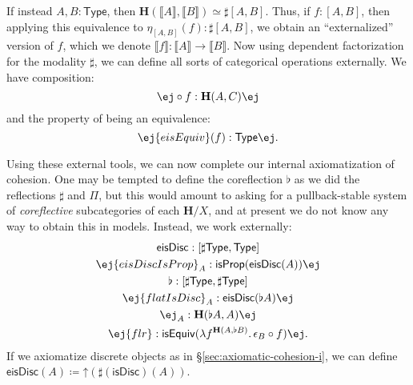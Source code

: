\documentclass[copyright]{eptcs}
\makeatletter
\newcommand{\type}{\ensuremath{\mathsf{Type}}\xspace}
\renewcommand{\H}{\ensuremath{\mathbf{H}}\xspace}
\newcommand{\esc}{\ensuremath{\mathord{\uparrow}}}
\def\jd#1{\@jd#1\ej}
\def\@jd#1|-#2\ej{\@@jd#1,,\;\vdash\;\left(#2\right)}
\def\@@jd#1,{\@ifmtarg{#1}{\let\next=\relax}{\left(#1\right)\let\next=\@@@jd}\next}
\def\@@@jd#1,{\@ifmtarg{#1}{\let\next=\relax}{,\,\left(#1\right)\let\next=\@@@jd}\next}
\def\cm{,}
\makeatother
\begin{document}
If instead $A,B:\type$, then $\H(\llbracket A\rrbracket, \llbracket B\rrbracket) \simeq \sharp[A,B]$.
Thus, if $f:[A,B]$, then applying this equivalence to $\eta_{[A,B]}(f): \sharp[A,B]$, we obtain an ``externalized'' version of $f$, which we denote $\llbracket f \rrbracket : \llbracket A\rrbracket \to \llbracket B\rrbracket$.
Now using dependent factorization for the modality $\sharp$, we can define all sorts of categorical operations externally.
We have composition:
\begin{equation*}
  \jd{A\cm B \cm C:\sharp\type, f:{\H(A, B)}, g:{\H(B, C)} |- g \circ f : \H(A,C)}
\end{equation*}
and the property of being an equivalence:
\[ \jd{A\cm B:\sharp \type, f:{\H(A,B)} |- \mathsf{eisEquiv}(f) : \type}. \]

Using these external tools, we can now complete our internal axiomatization of cohesion.
One may be tempted to define the coreflection $\flat$ as we did the reflections $\sharp$ and $\Pi$, but
this would amount to asking for a pullback-stable system of \emph{coreflective} subcategories of each $\H/X$, and at present we do not know any way to obtain this in models.
Instead, we work externally:
\begin{gather}
  \mathsf{eisDisc} : [\sharp\type,\type]\\
  \jd{A:\sharp\type |- \mathsf{eisDiscIsProp}_A : \mathsf{isProp}(\mathsf{eisDisc}(A))}\\
  \flat:[\sharp\type,\sharp\type]\\
  \jd{A:\sharp\type |- \mathsf{flatIsDisc}_A : \mathsf{eisDisc}(\flat A)}\\
  \jd{A:\sharp \type |- \epsilon_A : \H(\flat A, A)}\label{flatCounit}\\
  \jd{A\cm B:\sharp \type, \mathsf{ad} : \mathsf{eisDisc}(A) |-
    \mathsf{flr} : \mathsf{isEquiv}(\lambda f^{{\H(A,\flat B)}} . \, \epsilon_B \circ f)}.\label{eq:flatUniv}
\end{gather}
If we axiomatize discrete objects
as in \S\ref{sec:axiomatic-cohesion-i}, we can define
$\mathsf{eisDisc}(A) \coloneqq \esc(\sharp(\mathsf{isDisc})(A))$.
\end{document}
